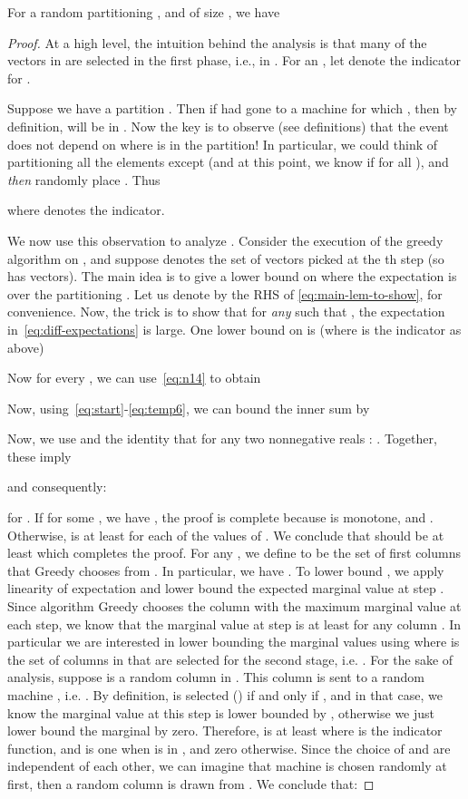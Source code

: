 \documentclass{article}
\begin{document}
\begin{lemma}\label{lem:opt-s}
For a random partitioning , and  of size , we have

\end{lemma}
\begin{proof}
At a high level, the intuition behind the analysis is that many of the vectors in  are selected in the first phase, i.e., in . For an  , let  denote the indicator for .

Suppose we have a partition . Then if  had gone to a machine  for which , then by definition,  will be in . Now the key is to observe (see definitions) that the event  does not depend on where  is in the partition! In particular, we could think of partitioning all the elements except  (and at this point, we know if  for all ), and {\em then} randomly place .  Thus

where  denotes the indicator.

We now use this observation to analyze . Consider the execution of the greedy algorithm on , and suppose  denotes the set of vectors picked at the th step (so  has  vectors). The main idea is to give a lower bound on
where the expectation is over the partitioning . Let us denote by  the RHS of \eqref{eq:main-lem-to-show}, for convenience.  Now, the trick is to show that for {\em any}  such that , the expectation in~\eqref{eq:diff-expectations} is large. One lower bound on  is (where  is the indicator as above) 

Now for every , we can use~\eqref{eq:n14} to obtain
 
  Now, using~\eqref{eq:start}-\eqref{eq:temp6}, we can bound the inner sum by

Now, we use  and the identity that for any two nonnegative reals : .
Together, these imply

and consequently: 
 
for . 
If for some , we have , the proof is complete because  is monotone, and . 
Otherwise,   is at least  for each of the  values of . We conclude that  should be at least  which completes the proof. 
\iffalse
For any , we define  to be the set of first  columns that Greedy chooses from .
In particular, we have .
To lower bound , we apply linearity of expectation and lower bound the expected marginal value  at step .
Since algorithm Greedy chooses the column with the maximum marginal value at each step, we know that the marginal value at step  is at least  for any column .
In particular we are interested in lower bounding the marginal values using  where  is the set of columns in  that are selected for the second stage, i.e. . For the sake of analysis, suppose  is a random column in .
This column is sent to a random machine , i.e. .
By definition,  is selected () if and only if , and in that case, we know the marginal value at this step is lower bounded by  , 
otherwise we just lower bound the marginal by zero.
Therefore,  is at least  where  is the indicator function, and is one when  is in , and zero otherwise. Since the choice of  and  are independent of each other, we can imagine that machine  is chosen randomly at first, then a random column  is drawn from . We conclude that: 




\end{proof}
\end{document}
